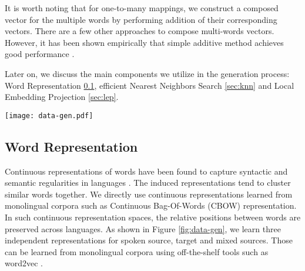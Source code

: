 \documentclass[a4paper]{article}
\begin{document}

%
It is worth noting that  for one-to-many mappings, we construct a composed vector for the multiple words by performing addition  of their corresponding vectors. There are a few other approaches to compose multi-words vectors. However, it has been shown  empirically that simple additive method achieves good performance \cite{mitchell2010composition}.

Later on, we discuss  the  main components we utilize in the generation process: Word Representation \textsection\ref{sec:reps}, efficient Nearest Neighbors Search \textsection\ref{sec:knn}  and Local Embedding Projection \textsection\ref{sec:lep}.

\begin{figure*}[tp]
	\centering
		\texttt{[image: data-gen.pdf]}
	\caption{Synthetic Data Generation Using LEP}
	\label{fig:data-gen}
\end{figure*}







\subsection {Word Representation}
\label{sec:reps}
Continuous representations of words have been found to capture syntactic and semantic regularities in languages \cite{MikolovSCCD13}.  The induced representations  tend to cluster similar words together. We  directly use continuous representations learned from monolingual corpora such as Continuous Bag-Of-Words (CBOW) representation. In such continuous
representation spaces, the relative positions between words are preserved across languages. 
As shown in Figure \ref{fig:data-gen}, we learn three independent representations for spoken source, target and mixed sources. Those can be learned from monolingual corpora using off-the-shelf tools such as word2vec \cite{MikolovSCCD13}.
\end{document}
